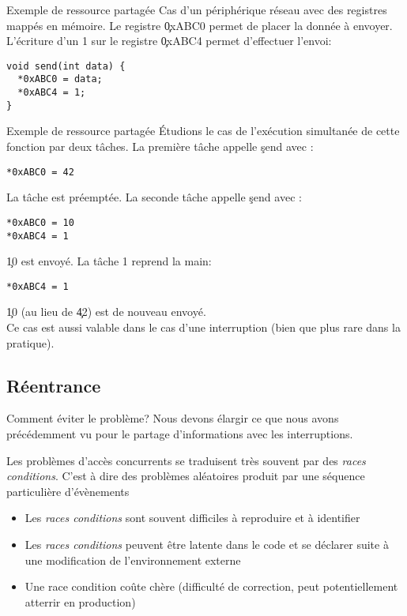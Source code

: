 \begin{frame}[fragile]{Exemple de ressource partagée}
  Cas d'un  périphérique réseau avec des registres  mappés en mémoire.
  Le  registre  \c{0xABC0}  permet  de  placer la  donnée  à  envoyer.
  L'écriture  d'un 1  sur  le registre  \c{0xABC4} permet  d'effectuer
  l'envoi:
\begin{lstlisting}
void send(int data) {
  *0xABC0 = data;
  *0xABC4 = 1;
}
  \end{lstlisting}
\end{frame}

\begin{frame}[fragile]{Exemple de ressource partagée}
  Étudions le cas de l'exécution simultanée de cette fonction par deux
  tâches.  La première tâche appelle \c{send} avec :
  \begin{lstlisting}
*0xABC0 = 42
  \end{lstlisting}
  La  tâche est  préemptée.  La  seconde tâche  appelle  \c{send} avec
  :
\begin{lstlisting}
*0xABC0 = 10
*0xABC4 = 1
\end{lstlisting}
  \c{10} est envoyé. La tâche 1 reprend la main:
\begin{lstlisting}
*0xABC4 = 1
\end{lstlisting}
  \c{10} (au lieu de \c{42}) est de nouveau envoyé.\\[3mm]

  Ce cas  est aussi valable dans  le cas d'une  interruption (bien que
  plus rare dans la pratique).
\end{frame}

\subsection{Réentrance}

\begin{frame}{Comment éviter le problème?}
  Nous devons élargir ce que nous avons précédemment vu pour le partage
  d'informations avec les interruptions.

  Les problèmes d'accès concurrents se traduisent très souvent par des
  \emph{races  conditions}.   C'est à  dire  des problèmes  aléatoires
  produit par une séquence particulière d'évènements
  \begin{itemize}
  \item   Les  \emph{races  conditions}   sont  souvent   difficiles  à
    reproduire et à identifier
  \item Les  \emph{races conditions} peuvent être latente  dans le code
    et se déclarer suite à une modification de l'environnement externe
  \item Une race condition coûte chère (difficulté de correction, peut
    potentiellement atterrir en production)
  \end{itemize}
\end{frame}

